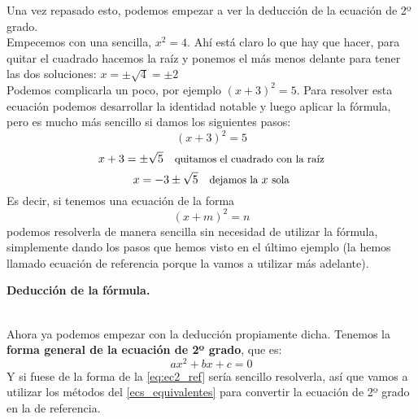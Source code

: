 \documentclass[a4paper,11pt,answers]{exam}
\begin{document}
Una vez repasado esto, podemos empezar a ver la deducción de la ecuación de 2º grado.\\
Empecemos con una sencilla, $x^2 = 4$. Ahí está claro lo que hay que hacer, para quitar el cuadrado
hacemos la raíz y ponemos el más menos delante para tener las dos soluciones:
$x= \pm \sqrt{4} = \pm 2$\\

Podemos complicarla un poco, por ejemplo $(x+3)^2= 5$. Para resolver esta ecuación podemos
desarrollar la identidad notable y luego aplicar la fórmula, pero es mucho más sencillo si damos los siguientes pasos:
\[(x+3)^2 = 5\]
\[x+3 = \pm \sqrt{5}\quad \text{\small quitamos el cuadrado con la raíz}\]
\[x = -3 \pm \sqrt{5}\quad \text{\small dejamos la }x\ \text{\small sola}\]
Es decir, si tenemos una ecuación de la forma
\begin{equation}
  \label{eq:ec2_ref}
  \tag{Ecuación de referencia}
  (x+m)^2 = n
\end{equation}
podemos resolverla de manera sencilla sin necesidad de utilizar la fórmula, simplemente dando los
pasos que hemos visto en el último ejemplo (la hemos llamado ecuación de referencia porque la vamos a utilizar más adelante).\\

\begin{large}
  \textbf{Deducción de la fórmula.}
\end{large}\\
Ahora ya podemos empezar con la deducción propiamente dicha.
Tenemos la \textbf{forma general de la ecuación de 2º grado}, que es:
\[ax^2 + bx + c = 0\]
Y si fuese de la forma de la \ref{eq:ec2_ref} sería sencillo resolverla, así que vamos a utilizar los métodos del \ref{ecs_equivalentes} para convertir la ecuación de 2º grado en la de referencia.\\
\end{document}
